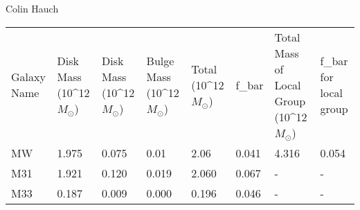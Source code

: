 \documentclass{article}
\begin{document}
Colin Hauch
\begin{table}[]
\begin{tabular}{llllllll}
Galaxy Name & Disk Mass (10^{12} \(M_\odot\)) & Disk Mass (10^{12} \(M_\odot\)) & Bulge Mass (10^{12} \(M_\odot\)) & Total (10^{12} \(M_\odot\)) & f_{bar} & Total Mass of Local Group (10^{12} \(M_\odot\)) & f_{bar} for local group \\
MW          & 1.975                         & 0.075                         & 0.01                           & 2.06                      & 0.041  & 4.316                                         & 0.054                  \\
M31         & 1.921                         & 0.120                         & 0.019                          & 2.060                     & 0.067  & -                                             & -                      \\
M33         & 0.187                         & 0.009                         & 0.000                          & 0.196                     & 0.046  & -                                             & -                     
\end{tabular}
\end{table}
\end{document}
